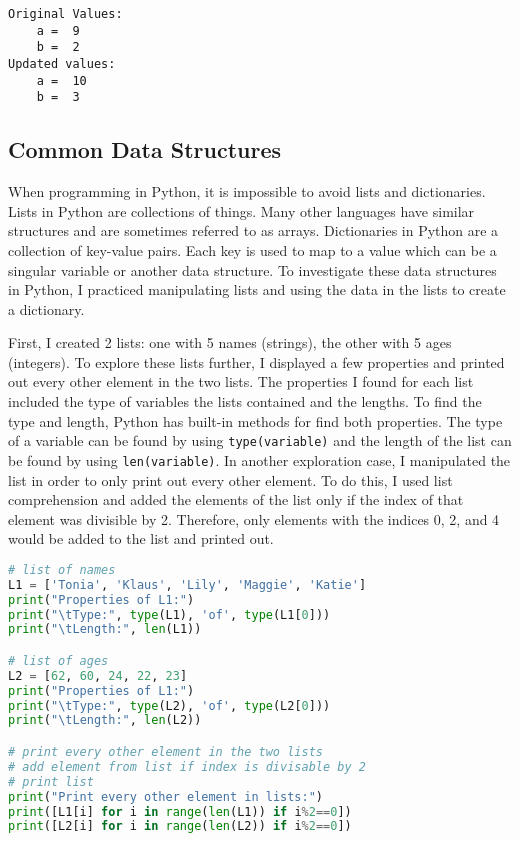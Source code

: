 \documentclass[journal]{IEEEtran}
\begin{document}
\begin{lstlisting}[caption={Numerical Value Investigation Output}]
Original Values: 
	a =  9
	b =  2
Updated values:
	a =  10
	b =  3
\end{lstlisting}


\subsection{Common Data Structures}
When programming in Python, it is impossible to avoid lists and dictionaries. Lists in Python are collections of things. Many other languages have similar structures and are sometimes referred to as arrays. Dictionaries in Python are a collection of key-value pairs. Each key is used to map to a value which can be a singular variable or another data structure. To investigate these data structures in Python, I practiced manipulating lists and using the data in the lists to create a dictionary.

First, I created 2 lists: one with 5 names (strings), the other with 5 ages (integers). To explore these lists further, I displayed a few properties and printed out every other element in the two lists. The properties I found for each list included the type of variables the lists contained and the lengths. To find the type and length, Python has built-in methods for find both properties. The type of a variable can be found by using \lstinline{type(variable)} and the length of the list can be found by using \lstinline{len(variable)}. In another exploration case, I manipulated the list in order to only print out every other element. To do this, I used list comprehension and added the elements of the list only if the index of that element was divisible by 2. Therefore, only elements with the indices 0, 2, and 4 would be added to the list and printed out. 
\begin{lstlisting}[language=Python, caption=Instantiating printing lists of names and ages.]
# list of names
L1 = ['Tonia', 'Klaus', 'Lily', 'Maggie', 'Katie']
print("Properties of L1:")
print("\tType:", type(L1), 'of', type(L1[0]))
print("\tLength:", len(L1))

# list of ages
L2 = [62, 60, 24, 22, 23]
print("Properties of L1:")
print("\tType:", type(L2), 'of', type(L2[0]))
print("\tLength:", len(L2))

# print every other element in the two lists 
# add element from list if index is divisable by 2
# print list 
print("Print every other element in lists:")
print([L1[i] for i in range(len(L1)) if i%2==0])
print([L2[i] for i in range(len(L2)) if i%2==0])
\end{lstlisting}
\end{document}
